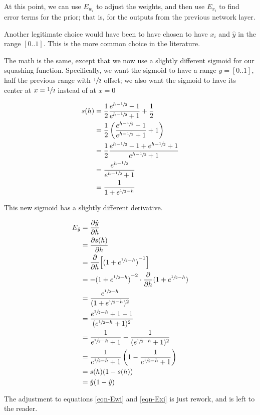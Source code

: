 \documentclass[12pt]{article}
\newcommand{\yhat}{{\hat y}}
\renewcommand{\d}{\partial}
\renewcommand{\dh}{{\partial h}}
\newcommand{\Half}{{\frac 1 2}}
\newcommand{\half}{{\sfrac 1 2}}
\newcommand{\ehh}{{e^{\half - h}}}
\begin{document}
At this point, we can use $E_{w_i}$ to adjust the weights,
and then use $E_{x_i}$ to find error terms for the prior;
that is, for the outputs from the previous network layer.

Another legitimate choice would have been to have chosen to
have $x_i$ and $\yhat$ in the range $[0..1]$. This is the
more common choice in the literature.

The math is the same, except that we now use a slightly
different sigmoid for our squashing function. Specifically,
we want the sigmoid to have a range $y = [0..1]$, half the
previous range with $\half$ offset; we also want the sigmoid
to have its center at $x = \half$ instead of at $x = 0$

\begin{align}
s(h) &= \Half \frac {e^{h - \half} - 1}  {e^{h - \half} + 1} + \Half \\
     &= \Half \left ( \frac {e^{h - \half} - 1} {e^{h - \half} + 1} + 1 \right ) \\
     &= \Half \frac {e^{h - \half} - 1 + e^{h - \half} + 1} {e^{h - \half} + 1} \\
     &= \frac {e^{h - \half}} {e^{h - \half} + 1} \\
     &= \frac 1 {1 + \ehh}
\end{align}

This new sigmoid has a slightly different derivative.

\begin{align}
E_\yhat &= \frac{\d \yhat}{\dh} \\
    &= \frac{\d s(h)}{\dh} \\
    &= \frac \d \dh {\left [{(1 + \ehh)}^{-1} \right ]} \\
    &= -{(1 + \ehh)}^{-2} \cdot \frac \d \dh {(1 + \ehh)} \\
    &= \frac{\ehh}{(1 + \ehh)^2} \\
    &= \frac{\ehh + 1 - 1}{(\ehh + 1)^2} \\
    &= \frac 1 {\ehh + 1} - \frac 1 {(\ehh + 1)^2} \\
    &= \frac 1 {\ehh + 1} \left ( 1 - \frac 1 {\ehh + 1} \right ) \\
    &= s(h) (1 - s(h)) \\
    &= \yhat (1 - \yhat)
\end{align}

The adjustment to equations \ref{eqn-Ewi} and \ref{eqn-Exi}
is just rework, and is left to the reader.
\end{document}
